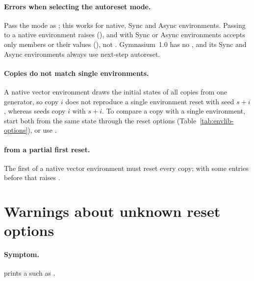 \paragraph{Errors when selecting the autoreset mode.}
Pass the mode as ;
this works for native, Sync and Async environments. Passing
 to a native environment raises
 (), and  with Sync or
Async environments accepts only  members
or their values (), not . Gymnasium~1.0 has
no , and its Sync and Async environments always use
next-step autoreset.

\paragraph{Copies do not match single environments.}
A native vector environment draws the initial states of all copies from one
generator, so copy $i$ does not reproduce a single environment reset with seed
$s + i$, whereas  seeds copy $i$ with $s + i$. To compare a
copy with a single environment, start both from the same state through the
reset options (Table~\ref{tab:envlib-options}), or use
.

\paragraph{ from a partial first reset.}
The first  of a native vector environment must reset every copy;
 with some entries 
before that raises .

\section{Warnings about unknown reset options}\label{sec:trouble-reset-options}

\paragraph{Symptom.}  prints a  such as
.

